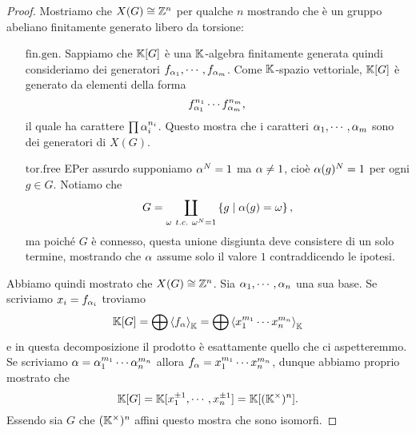 \begin{proof}
Mostriamo che $X(G)\cong \mathbb{Z}^n$ per qualche $n$ mostrando che \`e un gruppo abeliano finitamente generato libero da torsione:
\setlength{\leftmargini}{0cm}
\begin{itemize}
\item[$\boxed{\text{fin.gen.}}$] Sappiamo che $\mathbb{K}[G]$ \`e una $\mathbb{K}$-algebra finitamente generata quindi consideriamo dei generatori $f_{\alpha_1},\cdots, f_{\alpha_m}$. Come $\mathbb{K}$-spazio vettoriale, $\mathbb{K}[G]$ \`e generato da elementi della forma
\[f_{\alpha_1}^{n_1}\cdots f_{\alpha_m}^{n_m},\]
il quale ha carattere $\prod \alpha_i^{n_i}$. Questo mostra che i caratteri $\alpha_1,\cdots, \alpha_m$ sono dei generatori di $X(G)$.
\item[$\boxed{\text{tor.free}}$] EPer assurdo supponiamo $\alpha^N=1$ ma $\alpha\neq 1$, cio\`e $\alpha(g)^N=1$ per ogni $g\in G$. Notiamo che
\[G=\coprod_{\omega\ t.c.\ \omega^N=1}\cpa{g\mid \al(g)=\omega},\]
ma poich\'e $G$ \`e connesso, questa unione disgiunta deve consistere di un solo termine, mostrando che $\alpha$ assume solo il valore $1$ contraddicendo le ipotesi.
\end{itemize}
\setlength{\leftmargini}{0.5cm}
Abbiamo quindi mostrato che $X(G)\cong \mathbb{Z}^n$. Sia $\alpha_1,\cdots, \alpha_n$ una sua base. Se scriviamo $x_i=f_{\alpha_i}$ troviamo
\[\mathbb{K}[G]=\bigoplus \left\langle {f_\alpha}\right\rangle_{\mathbb{K}}=\bigoplus \left\langle {x_1^{m_1}\cdots x_n^{m_n}}\right\rangle_{\mathbb{K}}\]
e in questa decomposizione il prodotto \`e esattamente quello che ci aspetteremmo.
Se scriviamo $\alpha=\alpha_1^{m_1}\cdots\alpha_n^{m_n}$ allora $f_\alpha=x_1^{m_1}\cdots x_n^{m_n}$, dunque abbiamo proprio mostrato che
\[\mathbb{K}[G]=\mathbb{K}[x_1^{\pm1},\cdots, x_n^{\pm 1}]=\mathbb{K}[(\mathbb{K}^\times)^n].\]
Essendo sia $G$ che $(\mathbb{K}^\times)^n$ affini questo mostra che sono isomorfi.
\end{proof}




